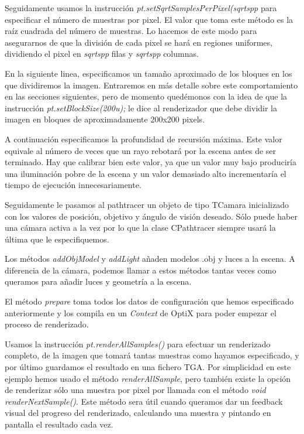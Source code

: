 \medskip

Seguidamente usamos la instrucción \emph{pt.setSqrtSamplesPerPixel(sqrtspp} para especificar el número de muestras por pixel. El valor que toma este método es la raíz cuadrada del número de muestras. Lo hacemos de este modo para asegurarnos de que la división de cada pixel se hará en regiones uniformes, dividiendo el pixel en \emph{sqrtspp} filas y \emph{sqrtspp} columnas.

\medskip

En la siguiente linea, especificamos un tamaño aproximado de los bloques en los que dividiremos la imagen. Entraremos en más detalle sobre este comportamiento en las secciones siguientes, pero de momento quedémonos con la idea de que la instrucción \emph{pt.setBlockSize(200u);} le dice al renderizador que debe dividir la imagen en bloques de aproximadamente 200x200 pixels. 

\medskip

A continuación especificamos la profundidad de recursión máxima. Este valor equivale al número de veces que un rayo rebotará por la escena antes de ser terminado. Hay que calibrar bien este valor, ya que un valor muy bajo produciría una iluminación pobre de la escena y un valor demasiado alto incrementaría el tiempo de ejecución innecesariamente.

\medskip

Seguidamente le pasamos al pathtracer un objeto de tipo TCamara inicializado con los valores de posición, objetivo y ángulo de visión deseado. Sólo puede haber una cámara activa a la vez por lo que la clase CPathtracer siempre usará la última que le especifiquemos.

\medskip

Los métodos \emph{addObjModel} y \emph{addLight} añaden modelos .obj y luces a la escena. A diferencia de la cámara, podemos llamar a estos métodos tantas veces como queramos para añadir luces y geometría a la escena.

\medskip

El método \emph{prepare} toma todos los datos de configuración que hemos especificado anteriormente y los compila en un \emph{Context} de OptiX para poder empezar el proceso de renderizado.

\medskip

Usamos la instrucción \emph{pt.renderAllSamples()} para efectuar un renderizado completo, de la imagen que tomará tantas muestras como hayamos especificado, y por último guardamos el resultado en una fichero TGA. Por simplicidad en este ejemplo hemos usado el método \emph{renderAllSample}, pero también existe la opción de renderizar sólo una muestra por pixel por llamada con el método \emph{void renderNextSample()}. Este método sera útil cuando queramos dar un feedback visual del progreso del renderizado, calculando una muestra y pintando en pantalla el resultado cada vez.

